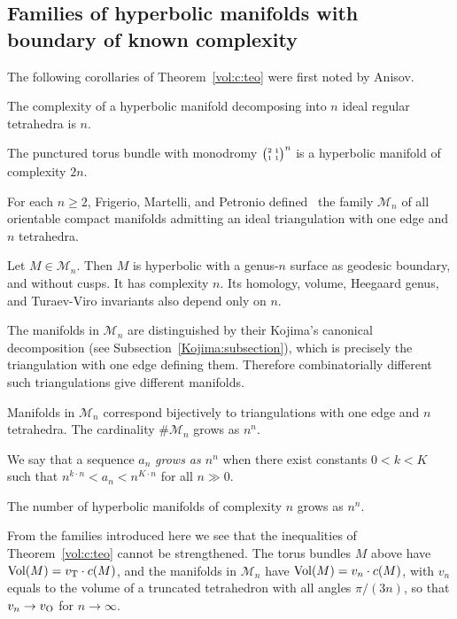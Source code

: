\documentclass[10pt]{article}      %
\makeatletter
\newcommand{\calM} {\ensuremath {\mathcal{M}}}
\newcommand{\Vol}{{\rm Vol}}
\newcommand{\voltet}{v_{\rm T}}
\newcommand{\voloct}{v_{\rm O}}
\newcommand{\matr} [4] 
{\left(\tiny{\begin{array}{@{}c@{\ }c@{}} #1 & #2 \\ #3 & #4 \\ \end{array}} \right)}
\makeatother
\begin{document}
\subsection{Families of hyperbolic manifolds with boundary of known complexity} 
\label{families:subsection}
The following corollaries of Theorem~\ref{vol:c:teo} were first noted by Anisov.
\begin{corollary}
The complexity of a hyperbolic manifold decomposing into $n$ ideal regular tetrahedra
is $n$.
\end{corollary}
\begin{corollary}
The punctured torus bundle with monodromy $\matr 2111^n$ is a hyperbolic manifold
of complexity $2n$.
\end{corollary}
For each $n\geqslant 2$, 
Frigerio, Martelli, and Petronio defined~\cite{FriMaPe} the family $\calM_n$  
of all orientable compact manifolds admitting an ideal triangulation with
one edge and $n$ tetrahedra.
\begin{theorem} \label{FriMaPe:teo}
Let $M\in\calM_n$. Then $M$ is hyperbolic with a genus-$n$ surface as geodesic boundary, and
without cusps. It has complexity $n$. Its homology, volume, 
Heegaard genus, and Turaev-Viro invariants also depend only on $n$. 
\end{theorem}
The manifolds in $\calM_n$ are distinguished by their Kojima's canonical decomposition 
(see Subsection~\ref{Kojima:subsection}), which is precisely the triangulation with one edge
defining them. Therefore combinatorially different such triangulations give different
manifolds. 
\begin{theorem} \label{FriMaPe:growth:teo}
Manifolds in $\calM_n$ correspond bijectively to triangulations with one edge and $n$ tetrahedra.
The cardinality $\#\calM_n$ grows as $n^n$.
\end{theorem}
We say that a sequence $a_n$ \emph{grows as $n^n$} when 
there exist constants $0<k<K$ such that $n^{k\cdot n}<a_n<n^{K\cdot n}$ for all $n\gg 0$.
\begin{corollary} \label{hyp:growth:teo}
The number of hyperbolic manifolds of complexity $n$ grows as $n^n$.
\end{corollary}
\begin{remark} \label{best:constants:rem}
From the families introduced here we see that the inequalities of Theorem~\ref{vol:c:teo}
cannot be strengthened. The torus bundles $M$ above have $\Vol(M)=\voltet\cdot c(M)$,
and the manifolds in $\calM_n$ have $\Vol(M) = v_n\cdot c(M)$, with $v_n$ equals to
the volume of a truncated tetrahedron with all angles $\pi/(3n)$, so that
$v_n\to\voloct$ for $n\to\infty$.
\end{remark}
\end{document}
